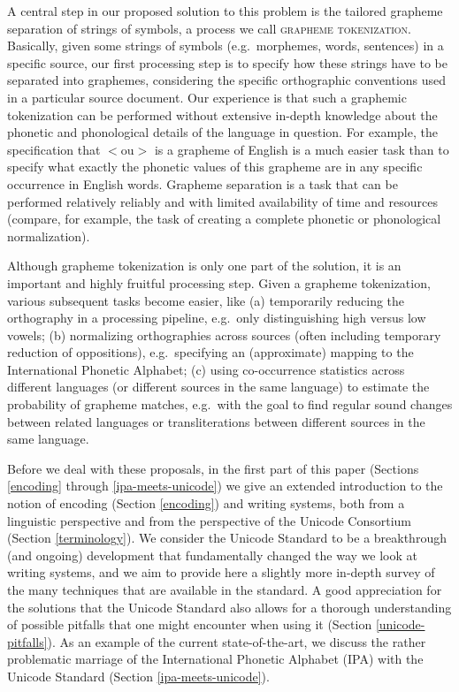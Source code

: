 A central step in our proposed solution to this problem is the tailored grapheme separation of strings of symbols, a process we call \textsc{grapheme tokenization}. Basically, given some strings of symbols (e.g.~morphemes, words, sentences) in a specific source, our first processing step is to specify how these strings have to be separated into graphemes, considering the specific orthographic conventions used in a particular source document. Our experience is that such a graphemic tokenization can be performed without extensive in-depth knowledge about the phonetic and phonological details of the language in question. For example, the specification that $<$ou$>$ is a grapheme of English is a much easier task than to specify what exactly the phonetic values of this grapheme are in any specific occurrence in English words. Grapheme separation is a task that can be performed relatively reliably and with limited availability of time and resources (compare, for example, the task of creating a complete phonetic or phonological normalization).

Although grapheme tokenization is only one part of the solution, it is an important and highly fruitful processing step. Given a grapheme tokenization, various subsequent tasks become easier, like (a) temporarily reducing the orthography in a processing pipeline, e.g.~only distinguishing high versus low vowels; (b) normalizing orthographies across sources (often including temporary reduction of oppositions), e.g.~specifying an (approximate) mapping to the International Phonetic Alphabet; (c) using co-occurrence statistics across different languages (or different sources in the same language) to estimate the probability of grapheme matches, e.g.~with the goal to find regular sound changes between related languages or transliterations between different sources in the same language.

Before we deal with these proposals, in the first part of this paper (Sections \ref{encoding} through \ref{ipa-meets-unicode}) we give an extended introduction to the notion of encoding (Section \ref{encoding}) and writing systems, both from a linguistic perspective and from the perspective of the Unicode Consortium (Section \ref{terminology}). We consider the Unicode Standard to be a breakthrough (and ongoing) development that fundamentally changed the way we look at writing systems, and we aim to provide here a slightly more in-depth survey of the many techniques that are available in the standard. A good appreciation for the solutions that the Unicode Standard also allows for a thorough understanding of possible pitfalls that one might encounter when using it (Section \ref{unicode-pitfalls}). As an example of the current state-of-the-art, we discuss the rather problematic marriage of the International Phonetic Alphabet (IPA) with the Unicode Standard (Section \ref{ipa-meets-unicode}).

